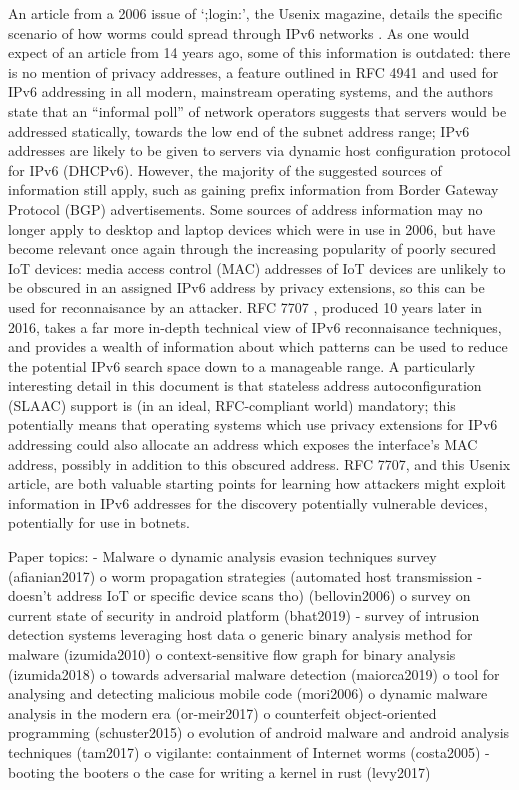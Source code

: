 \documentclass[10pt,sigconf]{acmart}
\begin{document}
An article from a 2006 issue of `;login:', the Usenix magazine, details the specific scenario of how worms could spread through IPv6 networks \cite{bellovin2006}.
As one would expect of an article from 14 years ago, some of this information is outdated:
there is no mention of privacy addresses, a feature outlined in RFC 4941 \cite{rfc-privacy-ext} and used for IPv6 addressing in all modern, mainstream operating systems,
and the authors state that an ``informal poll'' of network operators suggests that servers would be addressed statically, towards the low end of the subnet address range;
IPv6 addresses are likely to be given to servers via dynamic host configuration protocol for IPv6 (DHCPv6).
However, the majority of the suggested sources of information still apply, such as gaining prefix information from Border Gateway Protocol (BGP) advertisements.
Some sources of address information may no longer apply to desktop and laptop devices which were in use in 2006, but have become relevant once again through the increasing popularity of poorly secured IoT devices:
media access control (MAC) addresses of IoT devices are unlikely to be obscured in an assigned IPv6 address by privacy extensions, so this can be used for reconnaisance by an attacker.
RFC 7707 \cite{rfc-ipv6-rec}, produced 10 years later in 2016, takes a far more in-depth technical view of IPv6 reconnaisance techniques, and provides a wealth of information about which patterns can be used to reduce the potential IPv6 search space down to a manageable range.
A particularly interesting detail in this document is that stateless address autoconfiguration (SLAAC) support is (in an ideal, RFC-compliant world) mandatory;
this potentially means that operating systems which use privacy extensions for IPv6 addressing could also allocate an address which exposes the interface's MAC address, possibly in addition to this obscured address.
RFC 7707, and this Usenix article, are both valuable starting points for learning how attackers might exploit information in IPv6 addresses for the discovery potentially vulnerable devices, potentially for use in botnets.


Paper topics:
- Malware
	o dynamic analysis evasion techniques survey (afianian2017)
	o worm propagation strategies (automated host transmission - doesn't address IoT or specific device scans tho) (bellovin2006)
	o survey on current state of security in android platform (bhat2019)
	- survey of intrusion detection systems leveraging host data
	o generic binary analysis method for malware (izumida2010)
	o context-sensitive flow graph for binary analysis (izumida2018)
	o towards adversarial malware detection (maiorca2019)
	o tool for analysing and detecting malicious mobile code (mori2006)
	o dynamic malware analysis in the modern era (or-meir2017)
	o counterfeit object-oriented programming (schuster2015)
	o evolution of android malware and android analysis techniques (tam2017)
	o vigilante: containment of Internet worms (costa2005)
	- booting the booters
	o the case for writing a kernel in rust (levy2017)
\end{document}
